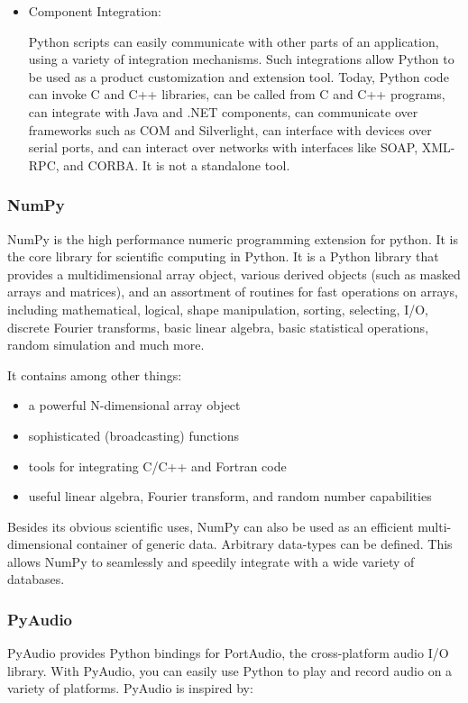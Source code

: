 \begin{itemize}
	\item Component Integration:
	
	Python scripts can easily communicate with other parts of an application, using a
	variety of integration mechanisms. Such integrations allow Python to be used as a
	product customization and extension tool. Today, Python code can invoke C and
	C++ libraries, can be called from C and C++ programs, can integrate with Java
	and .NET components, can communicate over frameworks such as COM and Silverlight, can interface with devices over serial ports, and can interact over networks
	with interfaces like SOAP, XML-RPC, and CORBA. It is not a standalone tool.
\end{itemize}
\subsubsection{NumPy}
NumPy is the high performance numeric programming extension for python. It is the core library for scientific computing in Python. It is a Python library that provides a multidimensional array object, various derived objects (such as masked arrays and matrices), and an assortment of routines for fast operations on arrays, including mathematical, logical, shape manipulation, sorting, selecting, I/O, discrete Fourier transforms, basic linear algebra, basic statistical operations, random simulation and much more.

It contains among other things:

\begin{itemize}
	\item a powerful N-dimensional array object
	\item sophisticated (broadcasting) functions
	\item tools for integrating C/C++ and Fortran code
	\item useful linear algebra, Fourier transform, and random number capabilities
\end{itemize}

Besides its obvious scientific uses, NumPy can also be used as an efficient multi-dimensional container of generic data. Arbitrary data-types can be defined. This allows NumPy to seamlessly and speedily integrate with a wide variety of databases.
\subsubsection{PyAudio}
PyAudio provides Python bindings for PortAudio, the cross-platform audio I/O library. With PyAudio, you can easily use Python to play and record audio on a variety of platforms. PyAudio is inspired by:

